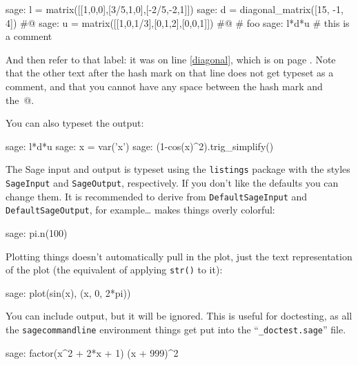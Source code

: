 \documentclass{article}
\begin{document}
\begin{sagecommandline}
  sage: l = matrix([[1,0,0],[3/5,1,0],[-2/5,-2,1]])
  sage: d = diagonal_matrix([15, -1, 4]) #@\label{diagonal}
  sage: u = matrix([[1,0,1/3],[0,1,2],[0,0,1]]) #@\label{anotherlabel} \# foo
  sage: l*d*u   # this is a comment
\end{sagecommandline}

And then refer to that label: it was on line \ref{diagonal}, which is on
page \pageref{diagonal}. Note that the other text after the hash mark on
that line does not get typeset as a comment, and that you cannot have
any space between the hash mark and the~@.

You can also typeset the output:

\renewcommand{\sagecommandlinetextoutput}{False}

\begin{sagecommandline}
  sage: l*d*u
  sage: x = var('x')
  sage: (1-cos(x)^2).trig_simplify()
\end{sagecommandline}

\renewcommand{\sagecommandlinetextoutput}{True}

The Sage input and output is typeset using the \texttt{listings} package
with the styles \texttt{SageInput} and \texttt{SageOutput},
respectively. If you don't like the defaults you can change them. It is
recommended to derive from \texttt{DefaultSageInput} and
\texttt{DefaultSageOutput}, for example\ldots
{}
makes things overly colorful:
\begin{sagecommandline}
  sage: pi.n(100)
\end{sagecommandline}

Plotting things doesn't automatically pull in the plot, just the text
representation of the plot (the equivalent of applying \texttt{str()} to
it):

\begin{sagecommandline}
  sage: plot(sin(x), (x, 0, 2*pi))
\end{sagecommandline}

You can include output, but it will be ignored. This is useful for
doctesting, as all the \texttt{sagecommandline} environment things get
put into the ``\texttt{\_doctest.sage}'' file.

\begin{sagecommandline}
  sage: factor(x^2 + 2*x + 1)
  (x + 999)^2
\end{sagecommandline}
\end{document}
